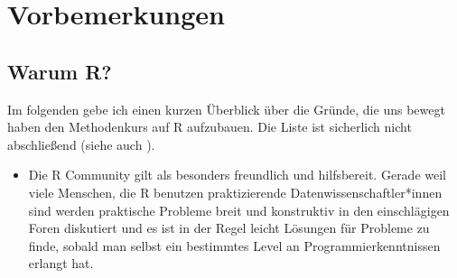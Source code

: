 \documentclass[]{book}
\begin{document}
\chapter{Vorbemerkungen}\label{precons}

\section{Warum R?}\label{warum-r}

Im folgenden gebe ich einen kurzen Überblick über die Gründe, die uns
bewegt haben den Methodenkurs auf R aufzubauen. Die Liste ist sicherlich
nicht abschließend (siehe auch \citet{adv-r}).

\begin{itemize}
\item
  Die R Community gilt als besonders freundlich und hilfsbereit. Gerade
  weil viele Menschen, die R benutzen praktizierende
  Datenwissenschaftler*innen sind werden praktische Probleme breit und
  konstruktiv in den einschlägigen Foren diskutiert und es ist in der
  Regel leicht Lösungen für Probleme zu finde, sobald man selbst ein
  bestimmtes Level an Programmierkenntnissen erlangt hat.


\end{itemize}
\end{document}
